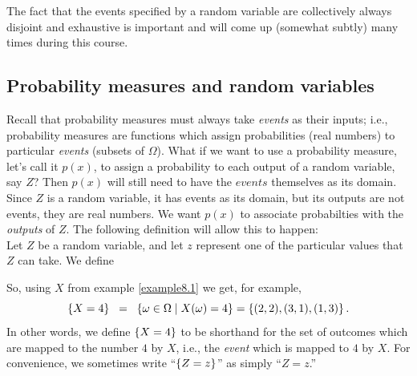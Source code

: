 \noindent The fact that the events specified by a random variable are collectively always disjoint and exhaustive is important and will come up (somewhat subtly) many times during this course.

\subsection{Probability measures and random variables} \label{sec8.1}
Recall that probability measures must always take \textit{events} as their inputs; i.e., probability measures are functions which assign probabilities (real numbers) to particular \textit{events} (subsets of $\Omega$). What if we want to use a probability measure, let's call it $p(x)$, to assign a probability to each output of a random variable, say $Z$? Then $p(x)$ will still need to have the $\textit{events}$ themselves as its domain. \\

\noindent Since $Z$ is a random variable, it has events as its domain, but its outputs are not events, they are real numbers. We want $p(x)$ to associate probabilties with the \textit{outputs} of $Z$. The following definition will allow this to happen: \\

\noindent Let $Z$ be a random variable, and let $z$ represent one of the particular values that $Z$ can take. We define \label{symbZ=z}

  	\bigskip
	
	\hfil{}
	\bigskip
	\bigskip
	
\noindent So, using $X$ from example \ref{example8.1} we get, for example,
\[
\left\{X = 4\right\} \;\; = \;\; \left\{\omega \in \Omega \mid X(\omega) = 4\right\} = \left\{(2,2),(3,1),(1,3)\right\}.
\]
\noindent In other words, we define $\left\{X = 4\right\}$ to be shorthand for the set of outcomes which are mapped to the number $4$ by $X$, i.e., the \textit{event} which is mapped to $4$ by $X$. For convenience, we sometimes write ``$\left\{Z = z\right\}$'' as simply ``$Z = z$.'' \\

